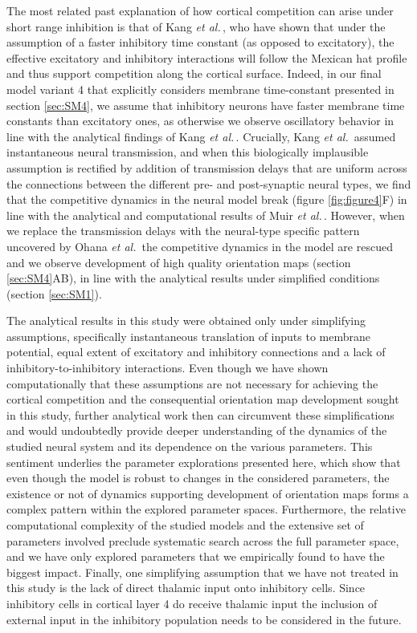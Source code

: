 \documentclass[utf8]{frontiersSCNS}
\newcommand{\etal}{\textit{et al.}}
\begin{document}
The most related past explanation of how cortical competition can arise under short range inhibition is that of Kang \etal\,\citep{Kang2003}, who have shown 
that under the assumption of a faster inhibitory time constant (as opposed to excitatory), the effective excitatory and inhibitory interactions will follow the 
Mexican hat profile and thus support competition along the cortical surface. Indeed, in our final model variant 4 that explicitly considers membrane time-constant presented in section \ref{sec:SM4}, 
we assume that inhibitory neurons have faster membrane time constants than excitatory ones, as otherwise we observe oscillatory behavior in line with the analytical findings of Kang \etal\,\citep{Kang2003}. 
Crucially, Kang \etal\,\citep{Kang2003} assumed instantaneous neural transmission, and when this biologically implausible assumption is rectified by addition of transmission delays that are uniform 
across the connections between the different pre- and post-synaptic neural types, we find that the competitive dynamics in the neural model break (figure \ref{fig:figure4}F) in line with the analytical and 
computational results of Muir \etal\,\citep{Muir2014}. However, when we replace the transmission delays with the neural-type specific  pattern uncovered by Ohana \etal\,\citep{Ohana2012} the competitive dynamics 
in the model are rescued and we observe development of high quality orientation maps (section \ref{sec:SM4}AB), in line with the analytical results under simplified conditions (section \ref{sec:SM1}).

The analytical results in this study were obtained only under simplifying assumptions, specifically instantaneous translation of inputs to membrane potential, equal extent of 
excitatory and inhibitory connections and a lack of inhibitory-to-inhibitory interactions. Even though we have shown computationally that these assumptions are not necessary 
for achieving the cortical competition and the consequential orientation map development sought in this study, further analytical work then can circumvent these simplifications and would 
undoubtedly provide deeper understanding of the dynamics of the studied neural system and its dependence on the various parameters. This sentiment underlies the parameter 
explorations presented here, which show that even though the model is robust to changes in the considered parameters, the existence or not of dynamics supporting development of 
orientation maps forms a complex pattern within the explored parameter spaces. Furthermore, the relative computational complexity of the studied models and the extensive set of parameters
involved preclude systematic search across the full parameter space, and we have only explored parameters that we empirically found to have the biggest impact. Finally, one simplifying assumption 
that we have not treated in this study is the lack of direct thalamic input onto inhibitory cells. Since inhibitory cells in cortical layer 4 do receive thalamic input \citep{Binzegger2004} the 
inclusion of external input in the inhibitory population needs to be considered in the future.
\end{document}
